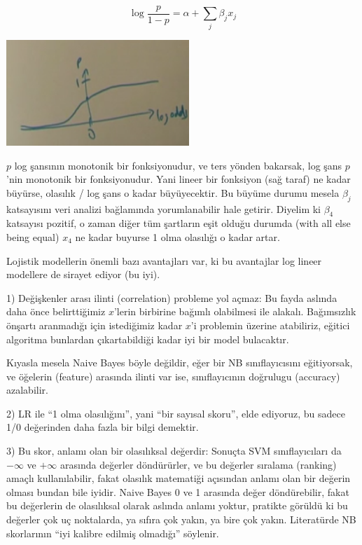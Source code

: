 \documentclass[12pt,fleqn]{article}\usepackage{../../common}
\begin{document}
$$
\log \frac{p}{1-p} = \alpha + \sum_j \beta_j x_j
$$

\includegraphics[height=4cm]{crf_2.png}

$p$ log şansının monotonik bir fonksiyonudur, ve ters yönden bakarsak, log
şans $p$'nin monotonik bir fonksiyonudur. Yani lineer bir fonksiyon (sağ
taraf) ne kadar büyürse, olasılık / log şans o kadar büyüyecektir. Bu
büyüme durumu mesela $\beta_j$ katsayısını veri analizi bağlamında
yorumlanabilir hale getirir. Diyelim ki $\beta_4$ katsayısı pozitif, o
zaman diğer tüm şartların eşit olduğu durumda (with all else being equal)
$x_4$ ne kadar buyurse 1 olma olasılığı o kadar artar.

Lojistik modellerin önemli bazı avantajları var, ki bu avantajlar log
lineer modellere de sirayet ediyor (bu iyi). 

1) Değişkenler arası ilinti (correlation) probleme yol açmaz: Bu fayda aslında
daha önce belirttiğimiz $x$'lerin birbirine bağımlı olabilmesi ile
alakalı. Bağımsızlık önşartı aranmadığı için istediğimiz kadar $x$'i problemin
üzerine atabiliriz, eğitici algoritma bunlardan çıkartabildiği kadar iyi bir
model bulacaktır.

Kıyasla mesela Naive Bayes böyle değildir, eğer bir NB sınıflayıcısını
eğitiyorsak, ve öğelerin (feature) arasında ilinti var ise, sınıflayıcının
doğrulugu (accuracy) azalabilir.

2) LR ile ``1 olma olasılığını'', yani ``bir sayısal skoru'', elde
ediyoruz, bu sadece 1/0 değerinden daha fazla bir bilgi demektir.

3) Bu skor, anlamı olan bir olasılıksal değerdir: Sonuçta SVM
sınıflayıcıları da $-\infty$ ve $+\infty$ arasında değerler döndürürler, ve
bu değerler sıralama (ranking) amaçlı kullanılabilir, fakat olasılık
matematiği açısından anlamı olan bir değerin olması bundan bile
iyidir. Naive Bayes 0 ve 1 arasında değer döndürebilir, fakat bu değerlerin
de olasılıksal olarak aslında anlamı yoktur, pratikte görüldü ki bu
değerler çok uç noktalarda, ya sıfıra çok yakın, ya bire çok
yakın. Literatürde NB skorlarının ``iyi kalibre edilmiş olmadığı''
söylenir.
\end{document}
